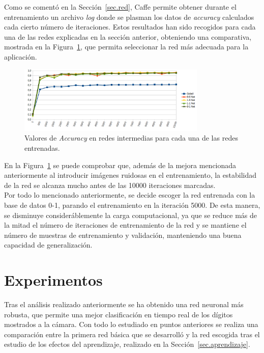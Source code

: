 Como se comentó en la Sección~\ref{sec.red}, Caffe permite obtener durante el entrenamiento un archivo \textit{log} donde se plasman los datos de \textit{accuracy} calculados cada cierto número de iteraciones. Estos resultados han sido recogidos para cada una de las redes explicadas en la sección anterior, obteniendo una comparativa, mostrada en la Figura~\ref{fig.iteraciones}, que permita seleccionar la red más adecuada para la aplicación.
\begin{figure}[H]
	\begin{center}
		\includegraphics[width=0.8\textwidth]{figures/iteraciones}
		\caption{Valores de \textit{Accuracy} en redes intermedias para cada una de las redes entrenadas.}
		\label{fig.iteraciones}
	\end{center}
\end{figure}
En la Figura~\ref{fig.iteraciones} se puede comprobar que, además de la mejora mencionada anteriormente al introducir imágenes ruidosas en el entrenamiento, la estabilidad de la red se alcanza mucho antes de las 10000 iteraciones marcadas.\\

Por todo lo mencionado anteriormente, se decide escoger la red entrenada con la base de datos 0-1, parando el entrenamiento en la iteración 5000. De esta manera, se disminuye consideráblemente la carga computacional, ya que se reduce más de la mitad el número de iteraciones de entrenamiento de la red y se mantiene el número de muestras de entrenamiento y validación, manteniendo una buena capacidad de generalización.

\section{Experimentos}
Tras el análisis realizado anteriormente se ha obtenido una red neuronal más robusta, que permite una mejor clasificación en tiempo real de los dígitos mostrados a la cámara. Con todo lo estudiado en puntos anteriores se realiza una comparación entre la primera red básica que se desarrolló y la red escogida tras el estudio de los efectos del aprendizaje, realizado en la Sección~\ref{sec.aprendizaje}.\\

